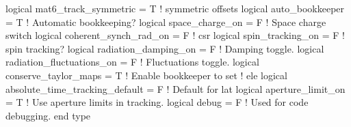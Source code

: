 \begin{example}
    logical mat6_track_symmetric = T           ! symmetric offsets
    logical auto_bookkeeper = T                ! Automatic bookkeeping?
    logical space_charge_on = F                ! Space charge switch
    logical coherent_synch_rad_on = F          ! csr 
    logical spin_tracking_on = F               ! spin tracking?
    logical radiation_damping_on = F           ! Damping toggle.
    logical radiation_fluctuations_on = F      ! Fluctuations toggle.
    logical conserve_taylor_maps = T           ! Enable bookkeeper to set
                                               ! ele%
    logical absolute_time_tracking_default = F ! Default for lat%
    logical aperture_limit_on = T              ! Use aperture limits in tracking.
    logical debug = F                          ! Used for code debugging.
  end type
\end{example}

